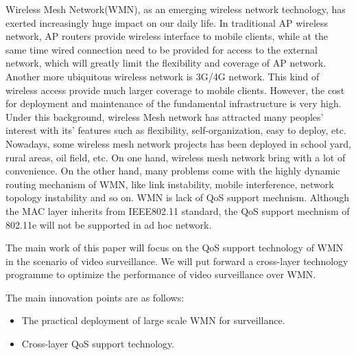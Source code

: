 \begin{eabstract}
Wireless Mesh Network(WMN), as an emerging wireless network technology, has exerted
increasingly huge impact on our daily life. In traditional AP wireless network,
AP routers provide wireless interface to mobile clients, while at the same time 
wired connection need to be provided for access to the external network, which 
will greatly limit the flexibility and coverage of AP network. Another more
ubiquitous wireless network is 3G/4G network. This kind of wireless access provide
much larger coverage to mobile clients. However, the cost for deployment and 
maintenance of the fundamental infrastructure is very high. Under this background, 
wireless Mesh network has attracted many peoples' interest with its' features
such as flexibility, self-organization, easy to deploy, etc. Nowadays, some 
wireless mesh network projects has been deployed in school yard, rural areas, 
oil field, etc. On one hand, wireless mesh network bring with a lot of convenience.
On the other hand, many problems come with the highly dynamic routing mechanism
of WMN, like link instability, mobile interference, network topology instability 
and so on. WMN is lack of QoS support mechnism. Although the MAC layer inherits from 
IEEE802.11 standard, the QoS support mechnism of 802.11e will not be supported in
ad hoc network.

The main work of this paper will focus on the QoS support technology of WMN 
in the scenario of video surveillance. We will put forward a cross-layer technology
programme to optimize the performance of video surveillance over WMN.

The main innovation points are as follows:
\begin{itemize}
\item The practical deployment of large scale WMN for surveillance.
\item Cross-layer QoS support technology.
\end{itemize}
\end{eabstract}

